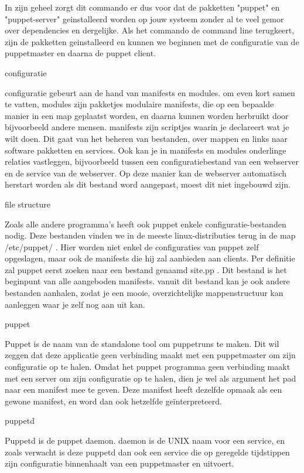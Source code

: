 In zijn geheel zorgt dit commando er dus voor dat de pakketten "puppet" en "puppet-server" geinstalleerd worden op jouw systeem zonder al te veel gemor over dependencies en dergelijke. Als het commando de command line terugkeert, zijn de pakketten geinstalleerd en kunnen we beginnen met de configuratie van de puppetmaster en daarna de puppet client.


configuratie

configuratie gebeurt aan de hand van manifests en modules. om even kort samen te vatten, modules zijn pakketjes modulaire manifests, die op een bepaalde manier in een map geplaatst worden, en daarna kunnen worden herbruikt door bijvoorbeeld andere mensen.
manifests zijn scriptjes waarin je declareert wat je wilt doen. Dit gaat van het beheren van bestanden, over mappen en links naar software pakketten en services.
Ook kan je in manifests en modules onderlinge relaties vastleggen, bijvoorbeeld tussen een configuratiebestand van een webserver en de service van de webserver.
Op deze manier kan de webserver automatisch herstart worden als dit bestand word aangepast, moest dit niet ingebouwd zijn.


file structure

Zoals alle andere programma's heeft ook puppet enkele configuratie-bestanden nodig. Deze bestanden vinden we in de meeste linux-distributies terug in de map /etc/puppet/ . Hier worden niet enkel de configuraties van puppet zelf opgeslagen, maar ook de manifests die hij zal aanbieden aan clients. Per definitie zal puppet eerst zoeken naar een bestand genaamd site.pp . Dit bestand is het beginpunt van alle aangeboden manifests. vanuit dit bestand kan je ook andere bestanden aanhalen, zodat je een mooie, overzichtelijke mappenstructuur kan aanleggen waar je zelf nog aan uit kan.


puppet

Puppet is de naam van de standalone tool om puppetruns te maken. Dit wil zeggen dat deze applicatie geen verbinding maakt met een puppetmaster om zijn configuratie op te halen. Omdat het puppet programma geen verbinding maakt met een server om zijn configuratie op te halen, dien je wel als argument het pad naar een manifest mee te geven. Deze manifest heeft dezelfde opmaak als een gewone manifest, en word dan ook hetzelfde geïnterpreteerd.

puppetd

Puppetd is de puppet daemon. daemon is de UNIX naam voor een service, en zoals verwacht is deze puppetd dan ook een service die op geregelde tijdstippen zijn configuratie binnenhaalt van een puppetmaster en uitvoert.

